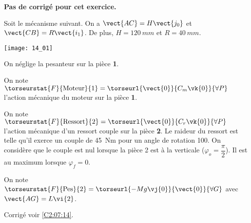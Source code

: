 \normalfalse \difficiletrue \tdifficilefalse
\correctionfalse


\setcounter{numques}{0}
\ifcorrection
\else
\textbf{Pas de corrigé pour cet exercice.}
\fi

\ifprof
\else
Soit le mécanisme suivant. On a $\vect{AC}=H\vect{j_0}$ et $\vect{CB}=R\vect{i_1}$. De plus, 
$H=\SI{120}{mm}$ et $R=\SI{40}{mm}$. 

\begin{center}
\texttt{[image: 14\_01]}
\end{center}
\fi

On néglige la pesanteur sur la pièce \textbf{1}. 

On note $\torseurstat{F}{\text{Moteur}}{1} = \torseurl{\vect{0}}{C_m\vk{0}}{\forall P}$ l'action mécanique du moteur sur la pièce \textbf{1}.

On note $\torseurstat{F}{\text{Ressort}}{2} = \torseurl{\vect{0}}{C_r\vk{0}}{\forall P}$ l'action mécanique d'un ressort couple sur la pièce \textbf{2}. Le raideur du ressort est telle qu'il exerce un couple de \SI{45}{Nm} pour un angle de rotation 100\degres. On considère que le couple est nul lorsque la pièce 2 est à la verticale ($\varphi_o=\dfrac{\pi}{2}$). Il est au maximum lorsque $\varphi_f=0$.

On note $\torseurstat{F}{\text{Pes}}{2} = \torseurl{-Mg\vj{0}}{\vect{0}}{\forall G}$ avec $\vect{AG}=L\vi{2}$. 

\ifprof
\else
\fi

\ifprof
\else
\fi

\ifprof
\else
\fi


\ifprof
\else
\fi


\ifprof
\else
\fi


\ifprof
\else
\begin{flushright}
\footnotesize{Corrigé  voir \ref{C2:07:14}.}
\end{flushright}%
\fi